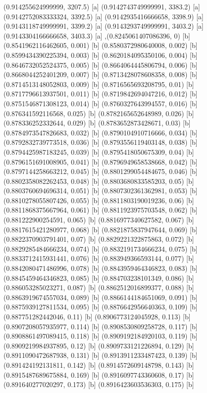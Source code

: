 {{{(0.914255624999999, 3207.5) [a] 
(0.9142743749999991, 3383.2) [a] 
(0.9142752083333324, 3392.5) [a] 
(0.9142935416666658, 3398.9) [a] 
(0.9143118749999991, 3399.2) [a] 
(0.9143293749999991, 3403.2) [a] 
(0.9143304166666658, 3403.3) [a] 
},{(0.8245061407086396, 0) [b] 
(0.8541962116462605, 0.001) [b] 
(0.8580372980640008, 0.002) [b] 
(0.8599434390225394, 0.003) [b] 
(0.8620184095350106, 0.004) [b] 
(0.8646732052524375, 0.005) [b] 
(0.8664064445806794, 0.006) [b] 
(0.8668044252401209, 0.007) [b] 
(0.8713428078608358, 0.008) [b] 
(0.8714513148052803, 0.009) [b] 
(0.8716565693208795, 0.01) [b] 
(0.8717796613937501, 0.011) [b] 
(0.8719842694047216, 0.012) [b] 
(0.8751546871308123, 0.014) [b] 
(0.8760327643994557, 0.016) [b] 
(0.876341592116568, 0.025) [b] 
(0.8782165652648989, 0.026) [b] 
(0.878336252332644, 0.029) [b] 
(0.8783652873428671, 0.03) [b] 
(0.8784973547826683, 0.032) [b] 
(0.8790104910716666, 0.034) [b] 
(0.8792832739773518, 0.036) [b] 
(0.8793556119403148, 0.038) [b] 
(0.8794425987183245, 0.039) [b] 
(0.8795418050675309, 0.04) [b] 
(0.8796151691008905, 0.041) [b] 
(0.8796949658538668, 0.042) [b] 
(0.8797144258663212, 0.045) [b] 
(0.8801299054484675, 0.046) [b] 
(0.8802358082262453, 0.048) [b] 
(0.8803680833585203, 0.05) [b] 
(0.8803760694696314, 0.051) [b] 
(0.8807302361362981, 0.053) [b] 
(0.8810278055807426, 0.055) [b] 
(0.8811803190019236, 0.06) [b] 
(0.8811868375667964, 0.061) [b] 
(0.8811923975703548, 0.062) [b] 
(0.881222900254591, 0.065) [b] 
(0.8816977340627582, 0.067) [b] 
(0.8817615421280977, 0.068) [b] 
(0.8821875837947644, 0.069) [b] 
(0.8822370903791401, 0.07) [b] 
(0.8829221322875863, 0.072) [b] 
(0.8829285484666234, 0.074) [b] 
(0.8832191734666234, 0.075) [b] 
(0.8833712415931441, 0.076) [b] 
(0.883949366593144, 0.077) [b] 
(0.8842080471486996, 0.078) [b] 
(0.8843959464346823, 0.083) [b] 
(0.8845459464346823, 0.085) [b] 
(0.884703238101349, 0.086) [b] 
(0.886053285023271, 0.087) [b] 
(0.8862512016899377, 0.088) [b] 
(0.8863919674557034, 0.089) [b] 
(0.8866144184651069, 0.091) [b] 
(0.8875939127811534, 0.095) [b] 
(0.8876642956640363, 0.109) [b] 
(0.887751282442046, 0.11) [b] 
(0.8906773124045928, 0.113) [b] 
(0.8907208057935977, 0.114) [b] 
(0.8908530809258728, 0.117) [b] 
(0.8908861497089415, 0.118) [b] 
(0.8909192184920103, 0.119) [b] 
(0.8909219984937895, 0.12) [b] 
(0.8909733121226894, 0.129) [b] 
(0.8911090472687938, 0.131) [b] 
(0.8913911233487423, 0.139) [b] 
(0.891424192131811, 0.142) [b] 
(0.8914572609148798, 0.143) [b] 
(0.8915487689675884, 0.169) [b] 
(0.8916097743360608, 0.17) [b] 
(0.891640277020297, 0.173) [b] 
(0.8916423603536303, 0.175) [b] 
}}}
